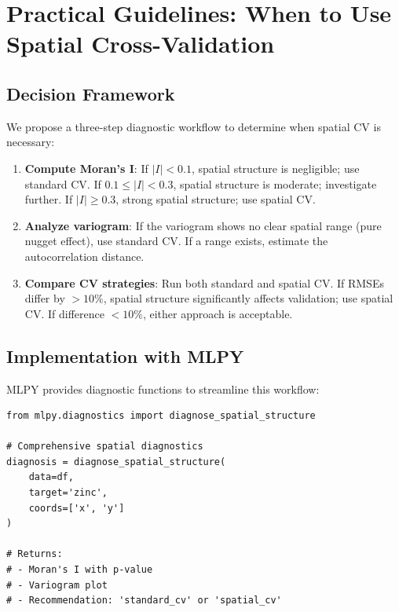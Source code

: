 \documentclass[a4paper,fleqn]{cas-sc}
\begin{document}



\section{Practical Guidelines: When to Use Spatial Cross-Validation}
\label{sec:guidelines}

\subsection{Decision Framework}

We propose a three-step diagnostic workflow to determine when spatial CV is necessary:

\begin{enumerate}
\item \textbf{Compute Moran's I}: If $|I| < 0.1$, spatial structure is negligible; use standard CV. If $0.1 \leq |I| < 0.3$, spatial structure is moderate; investigate further. If $|I| \geq 0.3$, strong spatial structure; use spatial CV.

\item \textbf{Analyze variogram}: If the variogram shows no clear spatial range (pure nugget effect), use standard CV. If a range exists, estimate the autocorrelation distance.

\item \textbf{Compare CV strategies}: Run both standard and spatial CV. If RMSEs differ by $>10\%$, spatial structure significantly affects validation; use spatial CV. If difference $<10\%$, either approach is acceptable.
\end{enumerate}

\subsection{Implementation with MLPY}

MLPY provides diagnostic functions to streamline this workflow:

\begin{verbatim}
from mlpy.diagnostics import diagnose_spatial_structure

# Comprehensive spatial diagnostics
diagnosis = diagnose_spatial_structure(
    data=df,
    target='zinc',
    coords=['x', 'y']
)

# Returns:
# - Moran's I with p-value
# - Variogram plot
# - Recommendation: 'standard_cv' or 'spatial_cv'
\end{verbatim}
\end{document}
